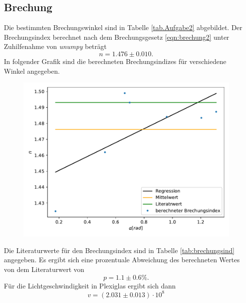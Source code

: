 \subsection{Brechung}
\label{sec:brechungauswertung}
Die bestimmten Brechungswinkel sind in Tabelle \ref{tab.Aufgabe2} abgebildet.
Der Brechungsindex berechnet nach dem Brechungsgesetz \eqref{eqn:brechung2} unter Zuhilfenahme von \textit{unumpy}
beträgt
\begin{equation}
  n = 1.476 \pm 0.010.
  \label{eqn:brechungsindexausw}
\end{equation}
In folgender Grafik sind die berechneten Brechungsindizes für verschiedene Winkel angegeben.
\begin{figure}[H]
  \centering
  \includegraphics[scale=0.7]{auswertung/plot2.pdf}
  \label{fig:plot2ausw}
\end{figure}
\noindent
Die Literaturwerte für den Brechungsindex sind in Tabelle \ref{tab:brechungsind} angegeben.
Es ergibt sich eine prozentuale Abweichung des berechneten Wertes von dem Literaturwert von
\begin{equation}
  p = 1.1 \pm 0.6 \si{\percent}.
  \label{eqn:abweichung}
\end{equation}
Für die Lichtgeschwindigkeit in Plexiglas ergibt sich dann
\begin{equation}
  v=(2.031 \pm 0.013) \cdot 10^8
  \label{eqn:lichtgeschwausw}
\end{equation}

